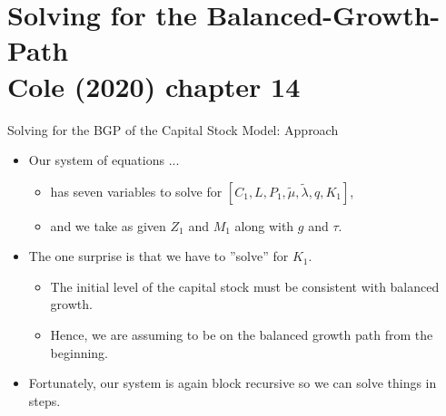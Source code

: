 \documentclass[10pt,c,aspectratio=1610,handout]{beamer}
\begin{document}
\section{Solving for the Balanced-Growth-Path\\{\small Cole (2020) chapter 14}}%
\begin{frame}{Solving for the BGP of the Capital Stock Model: Approach}%
  \begin{itemize}%
    \item[$\blacktriangleright$] Our system of equations ...%
    \begin{itemize}%
      \item[$\rightarrow$] has seven variables to solve for $\left[ C_{1},L,P_{1},\tilde{\mu},\tilde{\lambda},q,K_{1}\right]$,%
      \item[$\rightarrow$] and we take as given $Z_{1}$ and $M_{1}$ along with $g$ and $\tau$.%
    \end{itemize}%
    \vspace*{0.2in}%
    \pause%
    \item[$\blacktriangleright$] The one surprise is that we have to ''solve'' for $K_{1}.$
    \begin{itemize}%
      \item[$\rightarrow$] The initial level of the capital stock must be consistent with balanced growth.%
      \item[$\rightarrow$] Hence, we are assuming to be on the balanced growth path from the beginning.%
    \end{itemize}%
    \vspace*{0.2in}%
    \pause%
    \item[$\blacktriangleright$] Fortunately, our system is again block recursive so we can solve things in steps.%
  \end{itemize}%
\end{frame}%
\end{document}
